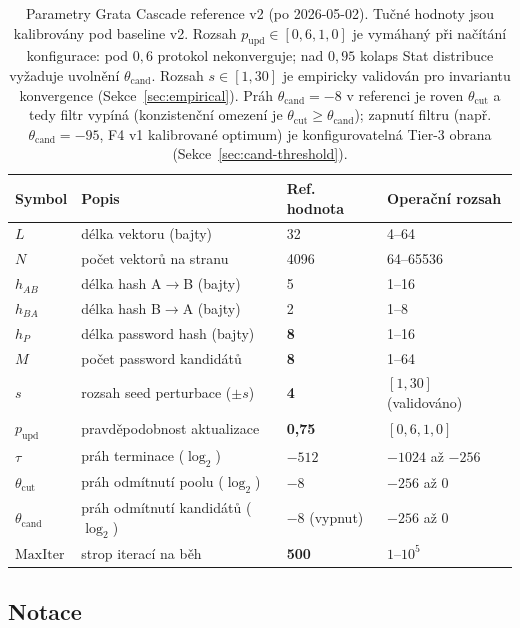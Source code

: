 \documentclass[11pt,a4paper]{article}
\begin{document}
\begin{table}[ht]
\centering
\small
\begin{tabular}{llll}
\toprule
Symbol & Popis & Ref. hodnota & Operační rozsah \\
\midrule
$L$ & délka vektoru (bajty) & 32 & 4--64 \\
$N$ & počet vektorů na stranu & 4096 & 64--65536 \\
$h_{AB}$ & délka hash A$\to$B (bajty) & 5 & 1--16 \\
$h_{BA}$ & délka hash B$\to$A (bajty) & 2 & 1--8 \\
$h_P$ & délka password hash (bajty) & \textbf{8} & 1--16 \\
$M$ & počet password kandidátů & \textbf{8} & 1--64 \\
$s$ & rozsah seed perturbace ($\pm s$) & \textbf{4} & $[1, 30]$ (validováno) \\
$p_\text{upd}$ & pravděpodobnost aktualizace & \textbf{0{,}75} & $[0{,}6, 1{,}0]$ \\
$\tau$ & práh terminace ($\log_2$) & $-512$ & $-1024$ až $-256$ \\
$\theta_{\text{cut}}$ & práh odmítnutí poolu ($\log_2$) & $-8$ & $-256$ až $0$ \\
$\theta_{\text{cand}}$ & práh odmítnutí kandidátů ($\log_2$) & \textbf{$-8$} (vypnut) & $-256$ až $0$ \\
$\text{MaxIter}$ & strop iterací na běh & \textbf{500} & $1$--$10^5$ \\
\bottomrule
\end{tabular}
\caption{Parametry Grata Cascade reference v2 (po 2026-05-02). Tučné hodnoty jsou kalibrovány pod baseline v2. Rozsah $p_\text{upd} \in [0{,}6, 1{,}0]$ je vymáhaný při načítání konfigurace: pod $0{,}6$ protokol nekonverguje; nad $0{,}95$ kolaps Stat distribuce vyžaduje uvolnění $\theta_{\text{cand}}$. Rozsah $s \in [1, 30]$ je empiricky validován pro invariantu konvergence (Sekce~\ref{sec:empirical}). Práh $\theta_{\text{cand}} = -8$ v referenci je roven $\theta_{\text{cut}}$ a tedy filtr vypíná (konzistenční omezení je $\theta_{\text{cut}} \geq \theta_{\text{cand}}$); zapnutí filtru (např. $\theta_{\text{cand}} = -95$, F4 v1 kalibrované optimum) je konfigurovatelná Tier-3 obrana (Sekce~\ref{sec:cand-threshold}).}
\label{tab:params}
\end{table}

\subsection{Notace}
\end{document}
